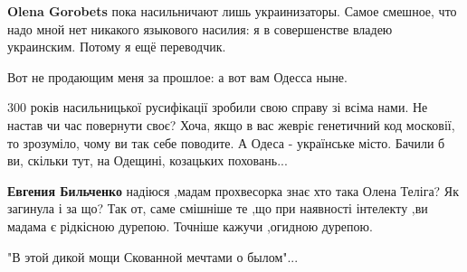 \begin{itemize}
\begin{itemize}
 
\textbf{Olena Gorobets} пока насильничают лишь украинизаторы. Самое смешное,
что надо мной нет никакого языкового насилия: я в совершенстве владею
украинским. Потому я ещё переводчик.

 
Вот не продающим меня за прошлое: а вот вам Одесса ныне.

 

300 років насильницької русифікації зробили свою справу зі всіма нами. Не
настав чи час повернути своє? Хоча, якщо в вас жевріє генетичний код московії,
то зрозуміло, чому ви так себе поводите. А Одеса - українське місто. Бачили б
ви, скільки тут, на Одещині, козацьких поховань...


 
\textbf{Евгения Бильченко} надіюся ,мадам прохвесорка знає хто така Олена
Теліга? Як загинула і за що? Так от, саме смішніше те ,що при наявності
інтелекту ,ви мадама є рідкісною дурепою. Точніше кажучи ,огидною дурепою.


\end{itemize}

 

"В этой дикой мощи Скованной мечтами о былом"...


\end{itemize}
